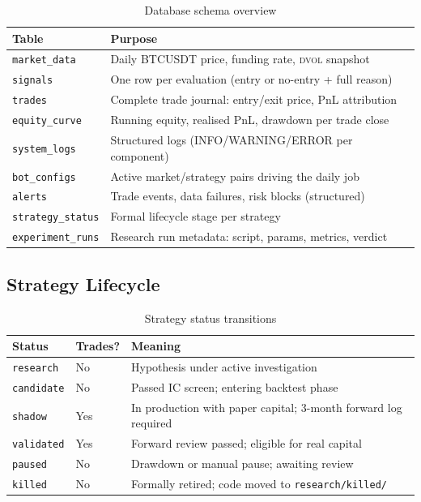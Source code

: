 \documentclass[12pt, a4paper]{article}
\theoremstyle{definition}
\newcommand{\DVOL}{\textsc{dvol}}
\begin{document}
\begin{table}[H]
\centering
\caption{Database schema overview}
\begin{tabularx}{\linewidth}{lX}
\toprule
\textbf{Table} & \textbf{Purpose} \\
\midrule
\texttt{market\_data}     & Daily BTCUSDT price, funding rate, \DVOL{} snapshot \\
\texttt{signals}          & One row per evaluation (entry or no-entry + full reason) \\
\texttt{trades}           & Complete trade journal: entry/exit price, PnL attribution \\
\texttt{equity\_curve}    & Running equity, realised PnL, drawdown per trade close \\
\texttt{system\_logs}     & Structured logs (INFO/WARNING/ERROR per component) \\
\texttt{bot\_configs}     & Active market/strategy pairs driving the daily job \\
\texttt{alerts}           & Trade events, data failures, risk blocks (structured) \\
\texttt{strategy\_status} & Formal lifecycle stage per strategy \\
\texttt{experiment\_runs} & Research run metadata: script, params, metrics, verdict \\
\bottomrule
\end{tabularx}
\end{table}

\subsection{Strategy Lifecycle}

\begin{table}[H]
\centering
\caption{Strategy status transitions}
\begin{tabular}{llp{7cm}}
\toprule
\textbf{Status} & \textbf{Trades?} & \textbf{Meaning} \\
\midrule
\texttt{research}   & No  & Hypothesis under active investigation \\
\texttt{candidate}  & No  & Passed IC screen; entering backtest phase \\
\texttt{shadow}     & Yes & In production with paper capital; 3-month forward log required \\
\texttt{validated}  & Yes & Forward review passed; eligible for real capital \\
\texttt{paused}     & No  & Drawdown or manual pause; awaiting review \\
\texttt{killed}     & No  & Formally retired; code moved to \texttt{research/killed/} \\
\bottomrule
\end{tabular}
\end{table}
\end{document}
